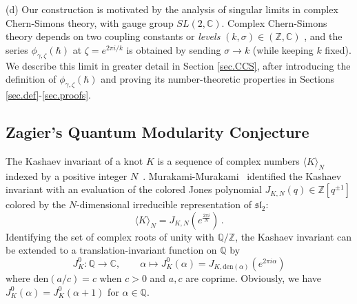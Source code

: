 \documentclass[12pt]{amsart}
\theoremstyle{definition}
\def\BZ{\mathbb Z}
\def\BQ{\mathbb Q}
\def\BC{\mathbb C}
\def\a{\alpha}
\def\la{\langle}
\def\ra{\rangle}
\def\longto{\longrightarrow}
\def\be{  \begin{equation} }
\def\ee{  \end{equation} }
\def\den{\mathrm{den}}
\newcommand{\C}{\mathbb{C}}
\newcommand{\Z}{\mathbb{Z}}
\begin{document}
\noindent
\rm{(d)}
Our construction is motivated by the analysis of singular limits in 
complex Chern-Simons theory, with gauge group $SL(2,\C)$.
Complex Chern-Simons theory depends on two coupling constants or 
{\em levels} $(k,\sigma)\in (\Z,\C)$ \cite{Witten-cx},
and the series $\phi_{\gamma,\zeta}(\hbar)$ at $\zeta=e^{2\pi i/k}$ is obtained 
by sending  $\sigma\to k$ (while keeping $k$ fixed). We describe this limit 
in greater detail in Section \ref{sec.CCS}, after introducing the definition 
of $\phi_{\gamma,\zeta}(\hbar)$ and proving its number-theoretic properties in 
Sections \ref{sec.def}-\ref{sec.proofs}.


\subsection{Zagier's Quantum Modularity Conjecture}
\label{sub.QMC}

The Kashaev invariant of a knot $K$ is a sequence of complex
numbers $\la K \ra_N$ indexed by a positive integer $N$~\cite{Kashaev95}. 
Murakami-Murakami~\cite{MM} identified the Kashaev invariant with an  
evaluation of the colored Jones polynomial $J_{K,N}(q) \in \BZ[q^{\pm 1}]$ 
colored by the $N$-dimensional irreducible
representation of $\mathfrak{sl}_2$:
$$
\la K \ra_N = J_{K,N}(e^{\frac{2 \pi i}{N}}) \,.
$$
Identifying the set of complex roots of unity with $\BQ/\BZ$, 
the Kashaev invariant can be extended to a translation-invariant function 
on $\BQ$ by
\be
J^0_K: \BQ \longto \BC, \qquad 
\a \mapsto J^0_K(\a)=J_{K,\den(\a)}(e^{2 \pi i \a})
\ee
where $\den(a/c)=c$ when $c>0$ and $a,c$ are coprime. Obviously, we have
$J^0_K(\a)=J^0_K(\a+1)$ for $\a \in \BQ$.
\end{document}

